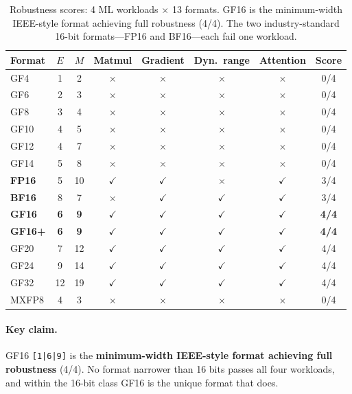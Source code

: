 \documentclass[11pt]{article}
\begin{document}
\begin{table}[h]
\centering
\small
\caption{Robustness scores: 4 ML workloads $\times$ 13 formats. GF16 is the
minimum-width IEEE-style format achieving full robustness (4/4). The two
industry-standard 16-bit formats---FP16 and BF16---each fail one workload.}
\label{tab:robustness}
\begin{tabular}{lcc ccccc}
\toprule
Format & $E$ & $M$ & Matmul & Gradient & Dyn.\ range & Attention & Score \\
\midrule
GF4   & 1  & 2  & $\times$ & $\times$ & $\times$ & $\times$ & 0/4 \\
GF6   & 2  & 3  & $\times$ & $\times$ & $\times$ & $\times$ & 0/4 \\
GF8   & 3  & 4  & $\times$ & $\times$ & $\times$ & $\times$ & 0/4 \\
GF10  & 4  & 5  & $\times$ & $\times$ & $\times$ & $\times$ & 0/4 \\
GF12  & 4  & 7  & $\times$ & $\times$ & $\times$ & $\times$ & 0/4 \\
GF14  & 5  & 8  & $\times$ & $\times$ & $\times$ & $\times$ & 0/4 \\
\textbf{FP16}  & 5  & 10 & $\checkmark$ & $\checkmark$ & $\boldsymbol{\times}$ & $\checkmark$ & 3/4 \\
\textbf{BF16}  & 8  & 7  & $\boldsymbol{\times}$ & $\checkmark$ & $\checkmark$ & $\checkmark$ & 3/4 \\
\textbf{GF16}  & \textbf{6}  & \textbf{9}  & $\boldsymbol{\checkmark}$ & $\boldsymbol{\checkmark}$ & $\boldsymbol{\checkmark}$ & $\boldsymbol{\checkmark}$ & \textbf{4/4} \\
\textbf{GF16+} & \textbf{6}  & \textbf{9}  & $\boldsymbol{\checkmark}$ & $\boldsymbol{\checkmark}$ & $\boldsymbol{\checkmark}$ & $\boldsymbol{\checkmark}$ & \textbf{4/4} \\
GF20  & 7  & 12 & $\checkmark$ & $\checkmark$ & $\checkmark$ & $\checkmark$ & 4/4 \\
GF24  & 9  & 14 & $\checkmark$ & $\checkmark$ & $\checkmark$ & $\checkmark$ & 4/4 \\
GF32  & 12 & 19 & $\checkmark$ & $\checkmark$ & $\checkmark$ & $\checkmark$ & 4/4 \\
MXFP8 & 4  & 3  & $\times$ & $\times$ & $\times$ & $\times$ & 0/4 \\
\bottomrule
\end{tabular}
\end{table}

\paragraph{Key claim.} GF16 \texttt{[1|6|9]} is the \textbf{minimum-width
IEEE-style format achieving full robustness} (4/4). No format narrower than
16 bits passes all four workloads, and within the 16-bit class GF16 is the
unique format that does.
\end{document}
